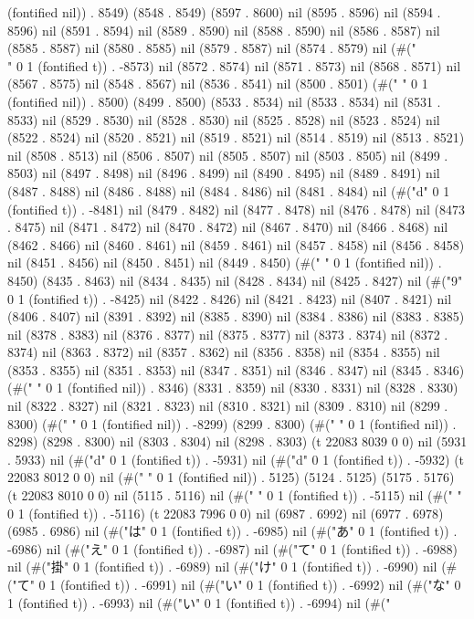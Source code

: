 (fontified nil)) . 8549) (8548 . 8549) (8597 . 8600) nil (8595 . 8596) nil (8594 . 8596) nil (8591 . 8594) nil (8589 . 8590) nil (8588 . 8590) nil (8586 . 8587) nil (8585 . 8587) nil (8580 . 8585) nil (8579 . 8587) nil (8574 . 8579) nil (#("\\" 0 1 (fontified t)) . -8573) nil (8572 . 8574) nil (8571 . 8573) nil (8568 . 8571) nil (8567 . 8575) nil (8548 . 8567) nil (8536 . 8541) nil (8500 . 8501) (#(" " 0 1 (fontified nil)) . 8500) (8499 . 8500) (8533 . 8534) nil (8533 . 8534) nil (8531 . 8533) nil (8529 . 8530) nil (8528 . 8530) nil (8525 . 8528) nil (8523 . 8524) nil (8522 . 8524) nil (8520 . 8521) nil (8519 . 8521) nil (8514 . 8519) nil (8513 . 8521) nil (8508 . 8513) nil (8506 . 8507) nil (8505 . 8507) nil (8503 . 8505) nil (8499 . 8503) nil (8497 . 8498) nil (8496 . 8499) nil (8490 . 8495) nil (8489 . 8491) nil (8487 . 8488) nil (8486 . 8488) nil (8484 . 8486) nil (8481 . 8484) nil (#("d" 0 1 (fontified t)) . -8481) nil (8479 . 8482) nil (8477 . 8478) nil (8476 . 8478) nil (8473 . 8475) nil (8471 . 8472) nil (8470 . 8472) nil (8467 . 8470) nil (8466 . 8468) nil (8462 . 8466) nil (8460 . 8461) nil (8459 . 8461) nil (8457 . 8458) nil (8456 . 8458) nil (8451 . 8456) nil (8450 . 8451) nil (8449 . 8450) (#(" " 0 1 (fontified nil)) . 8450) (8435 . 8463) nil (8434 . 8435) nil (8428 . 8434) nil (8425 . 8427) nil (#("9" 0 1 (fontified t)) . -8425) nil (8422 . 8426) nil (8421 . 8423) nil (8407 . 8421) nil (8406 . 8407) nil (8391 . 8392) nil (8385 . 8390) nil (8384 . 8386) nil (8383 . 8385) nil (8378 . 8383) nil (8376 . 8377) nil (8375 . 8377) nil (8373 . 8374) nil (8372 . 8374) nil (8363 . 8372) nil (8357 . 8362) nil (8356 . 8358) nil (8354 . 8355) nil (8353 . 8355) nil (8351 . 8353) nil (8347 . 8351) nil (8346 . 8347) nil (8345 . 8346) (#(" " 0 1 (fontified nil)) . 8346) (8331 . 8359) nil (8330 . 8331) nil (8328 . 8330) nil (8322 . 8327) nil (8321 . 8323) nil (8310 . 8321) nil (8309 . 8310) nil (8299 . 8300) (#(" " 0 1 (fontified nil)) . -8299) (8299 . 8300) (#(" " 0 1 (fontified nil)) . 8298) (8298 . 8300) nil (8303 . 8304) nil (8298 . 8303) (t 22083 8039 0 0) nil (5931 . 5933) nil (#("d" 0 1 (fontified t)) . -5931) nil (#("d" 0 1 (fontified t)) . -5932) (t 22083 8012 0 0) nil (#(" " 0 1 (fontified nil)) . 5125) (5124 . 5125) (5175 . 5176) (t 22083 8010 0 0) nil (5115 . 5116) nil (#("
" 0 1 (fontified t)) . -5115) nil (#("
" 0 1 (fontified t)) . -5116) (t 22083 7996 0 0) nil (6987 . 6992) nil (6977 . 6978) (6985 . 6986) nil (#("は" 0 1 (fontified t)) . -6985) nil (#("あ" 0 1 (fontified t)) . -6986) nil (#("え" 0 1 (fontified t)) . -6987) nil (#("て" 0 1 (fontified t)) . -6988) nil (#("掛" 0 1 (fontified t)) . -6989) nil (#("け" 0 1 (fontified t)) . -6990) nil (#("て" 0 1 (fontified t)) . -6991) nil (#("い" 0 1 (fontified t)) . -6992) nil (#("な" 0 1 (fontified t)) . -6993) nil (#("い" 0 1 (fontified t)) . -6994) nil (#("
